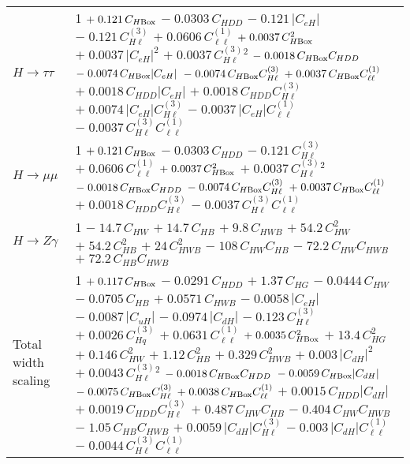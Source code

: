 \begin{tabular}{l|p{}}
    $H \rightarrow \tau\tau$ & 1 $+\;0.121\,C_{H\rm{Box}}$ $-\;0.0303\,C_{HDD}$ $-\;0.121\,|C_{eH}|$ $-\;0.121\,C^{(3)}_{H\ell}$ $+\;0.0606\,C^{(1)}_{\ell\ell}$ $+\;0.0037\,C_{H\rm{Box}}^{2}$ $+\;0.0037\,|C_{eH}|^{2}$ $+\;0.0037\,C^{(3)}_{H\ell}^{2}$ $-\;0.0018\,C_{H\rm{Box}}C_{HDD}$ $-\;0.0074\,C_{H\rm{Box}}|C_{eH}|$ $-\;0.0074\,C_{H\rm{Box}}C^{(3)}_{H\ell}$ $+\;0.0037\,C_{H\rm{Box}}C^{(1)}_{\ell\ell}$ $+\;0.0018\,C_{HDD}|C_{eH}|$ $+\;0.0018\,C_{HDD}C^{(3)}_{H\ell}$ $+\;0.0074\,|C_{eH}|C^{(3)}_{H\ell}$ $-\;0.0037\,|C_{eH}|C^{(1)}_{\ell\ell}$ $-\;0.0037\,C^{(3)}_{H\ell}C^{(1)}_{\ell\ell}$ \\
    $H \rightarrow \mu\mu$ & 1 $+\;0.121\,C_{H\rm{Box}}$ $-\;0.0303\,C_{HDD}$ $-\;0.121\,C^{(3)}_{H\ell}$ $+\;0.0606\,C^{(1)}_{\ell\ell}$ $+\;0.0037\,C_{H\rm{Box}}^{2}$ $+\;0.0037\,C^{(3)}_{H\ell}^{2}$ $-\;0.0018\,C_{H\rm{Box}}C_{HDD}$ $-\;0.0074\,C_{H\rm{Box}}C^{(3)}_{H\ell}$ $+\;0.0037\,C_{H\rm{Box}}C^{(1)}_{\ell\ell}$ $+\;0.0018\,C_{HDD}C^{(3)}_{H\ell}$ $-\;0.0037\,C^{(3)}_{H\ell}C^{(1)}_{\ell\ell}$ \\
    $H \rightarrow Z\gamma$ & 1 $-\;14.7\,C_{HW}$ $+\;14.7\,C_{HB}$ $+\;9.8\,C_{HWB}$ $+\;54.2\,C_{HW}^{2}$ $+\;54.2\,C_{HB}^{2}$ $+\;24\,C_{HWB}^{2}$ $-\;108\,C_{HW}C_{HB}$ $-\;72.2\,C_{HW}C_{HWB}$ $+\;72.2\,C_{HB}C_{HWB}$ \\
    \hline
    Total width scaling & 1 $+\;0.117\,C_{H\rm{Box}}$ $-\;0.0291\,C_{HDD}$ $+\;1.37\,C_{HG}$ $-\;0.0444\,C_{HW}$ $-\;0.0705\,C_{HB}$ $+\;0.0571\,C_{HWB}$ $-\;0.0058\,|C_{eH}|$ $-\;0.0087\,|C_{uH}|$ $-\;0.0974\,|C_{dH}|$ $-\;0.123\,C^{(3)}_{H\ell}$ $+\;0.0026\,C^{(3)}_{Hq}$ $+\;0.0631\,C^{(1)}_{\ell\ell}$ $+\;0.0035\,C_{H\rm{Box}}^{2}$ $+\;13.4\,C_{HG}^{2}$ $+\;0.146\,C_{HW}^{2}$ $+\;1.12\,C_{HB}^{2}$ $+\;0.329\,C_{HWB}^{2}$ $+\;0.003\,|C_{dH}|^{2}$ $+\;0.0043\,C^{(3)}_{H\ell}^{2}$ $-\;0.0018\,C_{H\rm{Box}}C_{HDD}$ $-\;0.0059\,C_{H\rm{Box}}|C_{dH}|$ $-\;0.0075\,C_{H\rm{Box}}C^{(3)}_{H\ell}$ $+\;0.0038\,C_{H\rm{Box}}C^{(1)}_{\ell\ell}$ $+\;0.0015\,C_{HDD}|C_{dH}|$ $+\;0.0019\,C_{HDD}C^{(3)}_{H\ell}$ $+\;0.487\,C_{HW}C_{HB}$ $-\;0.404\,C_{HW}C_{HWB}$ $-\;1.05\,C_{HB}C_{HWB}$ $+\;0.0059\,|C_{dH}|C^{(3)}_{H\ell}$ $-\;0.003\,|C_{dH}|C^{(1)}_{\ell\ell}$ $-\;0.0044\,C^{(3)}_{H\ell}C^{(1)}_{\ell\ell}$ \\
\end{tabular}